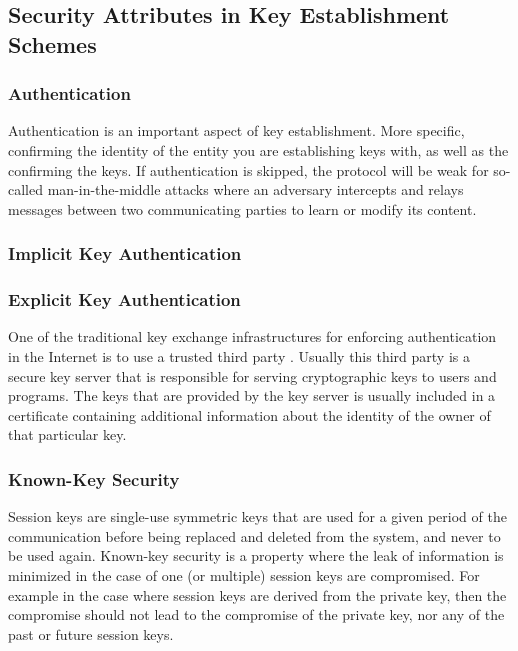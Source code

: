 \subsection{Security Attributes in Key Establishment Schemes}
\label{sec:attributes}


\subsubsection{Authentication}

Authentication is an important aspect of key establishment. More specific, confirming the identity of the entity you are establishing keys with, as well as the confirming the keys. If authentication is skipped, the protocol will be weak for so-called man-in-the-middle attacks where an adversary intercepts and relays messages between two communicating parties to learn or modify its content.



\subsubsection{Implicit Key Authentication}



\subsubsection{Explicit Key Authentication}

One of the traditional key exchange infrastructures for enforcing authentication in the Internet is to use a trusted third party \cite{maurer1996modelling}. Usually this third party is a secure key server that is responsible for serving cryptographic keys to users and programs. The keys that are provided by the key server is usually included in a certificate containing additional information about the identity of the owner of that particular key.

\subsubsection{Known-Key Security}

Session keys are single-use symmetric keys that are used for a given period of the communication before being replaced and deleted from the system, and never to be used again. Known-key security is a property where the leak of information is minimized in the case of one (or multiple) session keys are compromised. For example in the case where session keys are derived from the private key, then the compromise should not lead to the compromise of the private key, nor any of the past or future session keys. 

